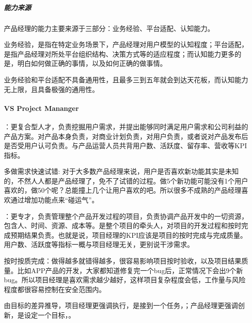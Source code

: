 \documentclass[letterpaper,10pt,english]{sphinxmanual}
\begin{document}
\subparagraph{能力来源}
\label{\detokenize{chapter_introduction/PM:id6}}
产品经理的能力主要来源于三部分：业务经验、平台适配、认知能力。

业务经验，是指在特定业务场景下，产品经理对用户模型的认知程度；平台适配，是指产品经理对所处平台组织结构、决策方式等的适应程度；而认知能力更多的是，明白如何做正确的事情，以及如何正确的做事情。

业务经验和平台适配不具备通用性，且最多三到五年就会到达天花板，而认知能力无上限，且具备极强的通用性。%
\begin{footnote}[167]\sphinxAtStartFootnote
{}
%
\end{footnote}


\paragraph{VS Project Mananger}
\label{\detokenize{chapter_introduction/PM:vs-project-mananger}}
：更复合型人才，负责挖掘用户需求，并提出能够同时满足用户需求和公司利益的产品方案。对产品本身负责，对商业计划负责，对用户负责，或者说对产品发布后是否受用户认可负责。与产品运营人员共背用户数、活跃度、留存率、营收等KPI指标。%
\begin{footnote}[168]\sphinxAtStartFootnote
{}
%
\end{footnote}

多做需求快速试错:
对于大多数产品经理来说，用户是否喜欢新功能其实是未知的，不然人人都是产品经理了，免不了试错的过程。做5个新功能可能没有1个用户喜欢的，做50个呢？总能撞上几个让用户喜欢的吧。所以很多不成熟的产品经理喜欢通过增加功能点来“碰运气”。

：更专才，负责管理整个产品开发过程的项目，负责协调产品开发中的一切资源，包含人、时间、资源、成本等。是整个项目的牵头人，对项目的开发过程和按时完成预期结果负责。也就是说，项目经理的KPI应该是项目的按时完成与完成质量。用户数、活跃度等指标一概与项目经理无关，更别说干涉需求。

按时按质完成：做得越多就错得越多，很容易影响项目按时验收，以及项目结果质量。比如APP产品的开发，大家都知道修复完一个bug后，正常情况下会出9个新bug。所以项目经理是喜欢需求越少越好，这样项目复杂程度会低，工作量与风险程度都很容易控制在安全范围内。

由目标的差异推导，项目经理更强调执行，是接到一个任务，；产品经理更强调创新，是设定一个目标，。
\end{document}
